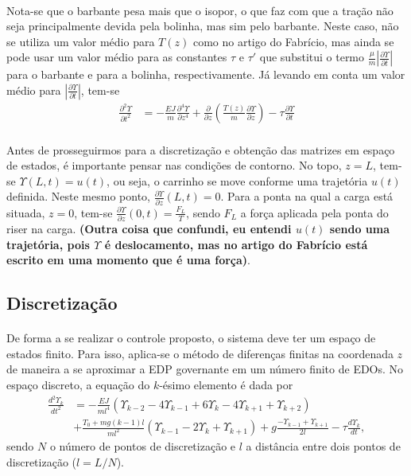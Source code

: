 \documentclass[a4paper,11pt]{scrartcl} %
\numberwithin{equation}{section} %
\numberwithin{figure}{section} %
\numberwithin{table}{section} %
\begin{document}
\paragraph{} Nota-se que o barbante pesa mais que o isopor, o que faz com que a tração não seja principalmente devida pela bolinha, mas sim pelo barbante. Neste caso, não se utiliza um valor médio para $T(z)$ como no artigo do Fabrício, mas ainda se pode usar um valor médio para as constantes $\tau$ e $\tau'$ que substitui o termo $\frac{\mu}{m}\left|\frac{\partial \Upsilon}{\partial t}\right|$ para o barbante e para a bolinha, respectivamente. Já levando em conta um valor médio para $\left|\frac{\partial \Upsilon}{\partial t}\right|$, tem-se \begin{align}
	\frac{\partial^2 \Upsilon}{\partial t^2} &= -\frac{EJ}{m}\frac{\partial^4 \Upsilon}{\partial z^4} + \frac{\partial}{\partial z}\left(\frac{T(z)}{m}\frac{\partial \Upsilon}{\partial z}\right) - \tau\frac{\partial \Upsilon}{\partial t}\label{EquacaoComTau}
	\end{align}

\paragraph{} Antes de prosseguirmos para a discretização e obtenção das matrizes em espaço de estados, é importante pensar nas condições de contorno. No topo, $z=L$, tem-se $\Upsilon(L,t)=u(t)$, ou seja, o carrinho se move conforme uma trajetória $u(t)$ definida. Neste mesmo ponto, $\frac{\partial\Upsilon}{\partial z}(L,t) = 0$. Para a ponta na qual a carga está situada, $z=0$, tem-se $\frac{\partial\Upsilon}{\partial z}(0,t) = \frac{F_L}{T}$, sendo $F_L$ a força aplicada pela ponta do riser na carga. \textbf{(Outra coisa que confundi, eu entendi $u(t)$ sendo uma trajetória, pois $\Upsilon$ é deslocamento, mas no artigo do Fabrício está escrito em uma momento que é uma força)}.

\subsection{Discretização}
\paragraph{} De forma a se realizar o controle proposto, o sistema deve ter um espaço de estados finito. Para isso, aplica-se o método de diferenças finitas na coordenada $z$ de maneira a se aproximar a EDP governante em um número finito de EDOs. No espaço discreto, a equação do $k$-ésimo elemento é dada por \begin{align}
	\frac{d^2\Upsilon_k}{dt^2} &= -\frac{EJ}{m l^4}\left(\Upsilon_{k-2} - 4\Upsilon_{k-1}+6\Upsilon_{k}-4\Upsilon_{k+1}+\Upsilon_{k+2}\right)\nonumber\\
	&+ \frac{T_0+mg(k-1)l}{m l^2}\left(\Upsilon_{k-1}-2\Upsilon_{k} + \Upsilon_{k+1}\right)+g\frac{-\Upsilon_{k-1}+\Upsilon_{k+1}}{2l}-\tau\frac{d\Upsilon_k}{dt},
\end{align} sendo $N$ o número de pontos de discretização e $l$ a distância entre dois pontos de discretização ($l = L/N$).
\end{document}
